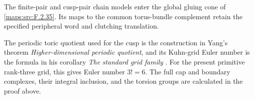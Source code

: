 The finite-pair and cusp-pair chain models enter the global
gluing cone of \cref{maps:src:F.2.35}. Its maps to the common
torus-bundle complement retain the specified peripheral word
and clutching translation.

The periodic toric quotient used for the cusp is the construction in
Yang's theorem \emph{Higher-dimensional periodic quotient}, and its
Kuhn-grid Euler number is the formula in his corollary
\emph{The standard grid family}
\cite[Theorem 8.7, pp.~57--59, and Corollary 8.8, p.~59, attached source build]{manYang26}.
For the present primitive rank-three grid, this gives Euler number
$3!=6$.  The full cap and boundary complexes, their integral inclusion,
and the torsion groups are calculated in the proof above.







